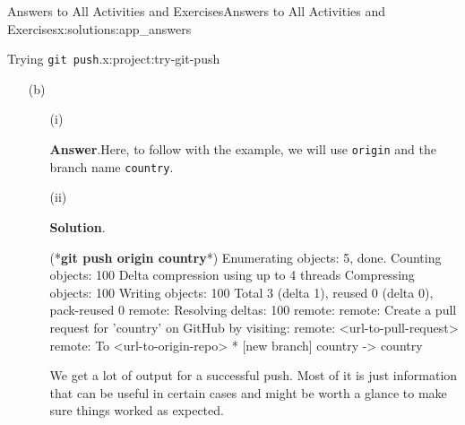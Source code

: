 \documentclass[oneside,10pt,]{book}
\newcommand{\blocktitlefont}{\relax}
\newcommand{\mono}[1]{\texttt{#1}}
\newcommand{\consoleinput}[1]{\textbf{#1}}
\begin{document}
\begin{solutions-chapter}{Answers to All Activities and Exercises}{}{Answers to All Activities and Exercises}{}{}{x:solutions:app_answers}
\begin{projectsolution}{4.7}{Trying \mono{git push}.}{x:project:try-git-push}
\begin{enumerate}[font=\bfseries,label=(\alph*),ref=\alph*]
\begin{enumerate}[font=\bfseries,label=(\roman*),ref=\theenumi.\roman*]
\begin{console}{0}{1}{0}
    git push --set-upstream origin country
\end{console}
Well, look at that, the same error. This should make sense. You are telling Git to push changes to the origin repo but \mono{country}, the current branch, doesn't have an origin since we created the branch locally.%
\item[(iii)]\par\smallskip%
\noindent\textbf{\blocktitlefont Solution}.\hypertarget{g:solution:idp616274056-back}{}\quad{}\begin{console}{0}{1}{0}
(*\consoleinput{git push country}*)
fatal: 'country' does not appear to be a git repository
fatal: Could not read from remote repository.

Please make sure you have the correct access rights
and the repository exists.
\end{console}
Remember the four parts to \mono{git push}? Well since we forgot Step 3, the remote name, Git assumes that the word ``country'' is the name of the repo we want to push to. Since there is no repo named ``country'' on your computer nor on GitHub, it doens't know where to push and errors out.%
\end{enumerate}
\item[(b)]\begin{enumerate}[font=\bfseries,label=(\roman*),ref=\theenumi.\roman*]
\item[(i)]\par\smallskip%
\noindent\textbf{\blocktitlefont Answer}.\hypertarget{g:answer:idp616016008-back}{}\quad{}Here, to follow with the example, we will use \mono{origin} and the branch name \mono{country}.%
\item[(ii)]\par\smallskip%
\noindent\textbf{\blocktitlefont Solution}.\hypertarget{g:solution:idp616014856-back}{}\quad{}\begin{console}{0}{1}{0}
(*\consoleinput{git push origin country}*)
Enumerating objects: 5, done.
Counting objects: 100%
Delta compression using up to 4 threads
Compressing objects: 100%
Writing objects: 100%
Total 3 (delta 1), reused 0 (delta 0), pack-reused 0
remote: Resolving deltas: 100%
remote: 
remote: Create a pull request for 'country' on GitHub by visiting:
remote:      <url-to-pull-request>
remote: 
To <url-to-origin-repo>
 * [new branch]      country -> country
\end{console}
We get a lot of output for a successful push. Most of it is just information that can be useful in certain cases and might be worth a glance to make sure things worked as expected.%

\end{enumerate}
\end{enumerate}
\end{projectsolution}
\end{solutions-chapter}
\end{document}
